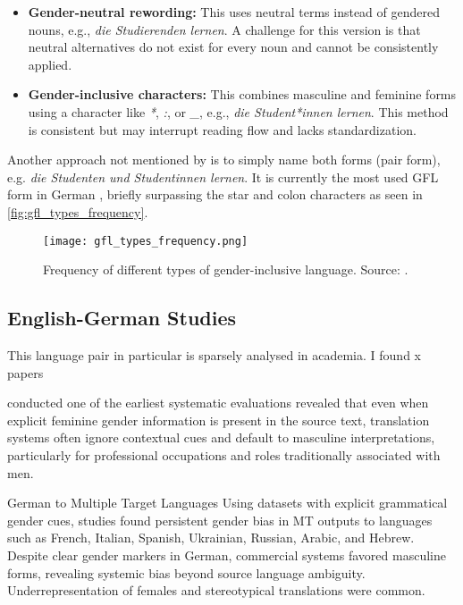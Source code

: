 \begin{itemize}
    \item \textbf{Gender-neutral rewording:}  
    This uses neutral terms instead of gendered nouns, e.g., \textit{die Studierenden lernen}. A challenge for this version is that neutral alternatives do not exist for every noun and cannot be consistently applied.

    \item \textbf{Gender-inclusive characters:}  
    This combines masculine and feminine forms using a character like \textit{*}, \textit{:}, or \textit{\_}, e.g., \textit{die Student*innen lernen}. This method is consistent but may interrupt reading flow and lacks standardization.
\end{itemize}

\noindent Another approach not mentioned by \citeauthor{lardelliBuildingBridgesDataset2024} is to simply name both forms (pair form), e.g. \textit{die Studenten und Studentinnen lernen}. It is currently the most used GFL form in German \citep{waldendorfWordsChangeIncrease2024}, briefly surpassing the star and colon characters as seen in \autoref{fig:gfl_types_frequency}.

\begin{figure}
	\centering
		\texttt{[image: gfl\_types\_frequency.png]}
	\caption{Frequency of different types of gender-inclusive language. Source: \citet{waldendorfWordsChangeIncrease2024}.}
	\label{fig:gfl_types_frequency}
\end{figure}


\subsection{English-German Studies}
This language pair in particular is sparsely analysed in academia. I found x papers 

\citet{stanovskyEvaluatingGenderBias2019} conducted one of the earliest systematic evaluations revealed that even when explicit feminine gender information is present in the source text, translation systems often ignore contextual cues and default to masculine interpretations, particularly for professional occupations and roles traditionally associated with men.


German to Multiple Target Languages
Using datasets with explicit grammatical gender cues, studies found persistent gender bias in MT outputs to languages such as French, Italian, Spanish, Ukrainian, Russian, Arabic, and Hebrew. Despite clear gender markers in German, commercial systems favored masculine forms, revealing systemic bias beyond source language ambiguity. Underrepresentation of females and stereotypical translations were common.


